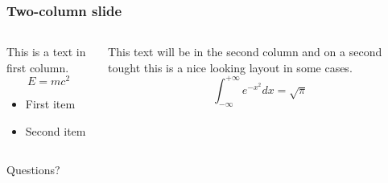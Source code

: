 \documentclass{beamer}
\begin{document}
\begin{frame}
\frametitle{Two-column slide}
\begin{columns}
  \begin{column}{0.5\textwidth}
This is a text in first column.
\[
E=mc^2
\]
\begin{itemize}
\item First item
\item Second item
\end{itemize}
\end{column}

\begin{column}{0.5\textwidth}
This text will be in the second column
and on a second tought this is a nice looking
layout in some cases.
\[
  \int_{-\infty}^{+\infty}e^{-x^2}dx=\sqrt{\pi}
\]
\end{column}
\end{columns}
\end{frame}

\begin{frame}[standout]
  Questions?
\end{frame}
\end{document}

